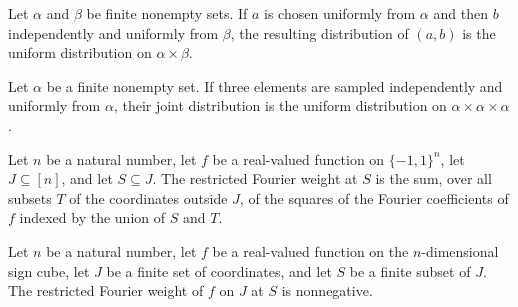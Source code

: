 \begin{theorem}
\label{FABL.uniformPMF_bind_map_pair}
\leanok
{}
Let $\alpha$ and $\beta$ be finite nonempty sets. If $a$ is chosen uniformly from
$\alpha$ and then $b$ independently and uniformly from $\beta$, the resulting
distribution of $(a,b)$ is the uniform distribution on $\alpha\times\beta$.
\end{theorem}

\begin{theorem}
\label{FABL.uniformPMF_bind_bind_map_triple}
\leanok
{}
Let $\alpha$ be a finite nonempty set. If three elements are sampled independently and
uniformly from $\alpha$, their joint distribution is the uniform distribution on
$\alpha\times\alpha\times\alpha$.
\end{theorem}

\begin{definition}
\label{FABL.restrictedFourierWeight}
\leanok
{}
Let $n$ be a natural number, let $f$ be a real-valued function on $\{−1,1\}^n$, let
$J\subseteq[n]$, and let $S\subseteq J$. The restricted Fourier weight at $S$ is the
sum, over all subsets $T$ of the coordinates outside $J$, of the squares of the Fourier
coefficients of $f$ indexed by the union of $S$ and $T$.
\end{definition}

\begin{theorem}
\label{FABL.restrictedFourierWeight_nonneg}
\leanok
{}
Let $n$ be a natural number, let $f$ be a real-valued function on the $n$-dimensional
sign cube, let $J$ be a finite set of coordinates, and let $S$ be a finite subset of
$J$. The restricted Fourier weight of $f$ on $J$ at $S$ is nonnegative.
\end{theorem}

